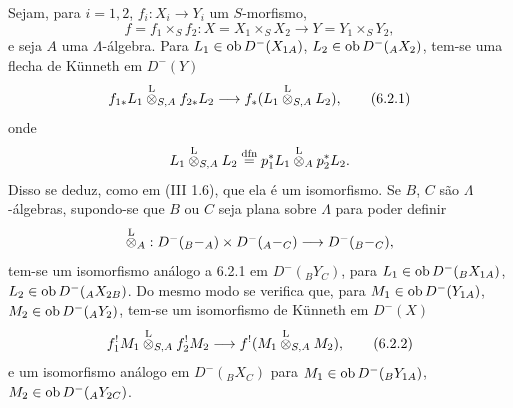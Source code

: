 Sejam, para $i=1,2$, $f_i:X_i\to Y_i$ um $S$-morfismo,
\[
f=f_1\times_S f_2:X=X_1\times_SX_2\longrightarrow Y=Y_1\times_SY_2,
\]
e seja $A$ uma $\Lambda$-álgebra. Para $L_1\in\operatorname{ob} D^-(X_{1A})$, $L_2\in\operatorname{ob} D^-({}_AX_2)$, tem-se uma flecha de Künneth em $D^-(Y)$
\begin{equation}
f_{1*}L_1\overset{\mathrm L}{\otimes}_{S,A}f_{2*}L_2
\longrightarrow
f_*(L_1\overset{\mathrm L}{\otimes}_{S,A}L_2),
\tag{6.2.1}
\end{equation}
onde
\[
L_1\overset{\mathrm L}{\otimes}_{S,A}L_2
\stackrel{\mathrm{dfn}}{=}p_1^*L_1\overset{\mathrm L}{\otimes}_Ap_2^*L_2.
\]
Disso se deduz, como em (III 1.6), que ela é um isomorfismo. Se $B$, $C$ são $\Lambda$-álgebras, supondo-se que $B$ ou $C$ seja plana sobre $\Lambda$ para poder definir
\[
\overset{\mathrm L}{\otimes}_A:D^-({}_B{-}_A)\times D^-({}_A{-}_C)\longrightarrow D^-({}_B{-}_C),
\]
tem-se um isomorfismo análogo a 6.2.1 em $D^-({}_BY_C)$, para $L_1\in\operatorname{ob} D^-({}_BX_{1A})$, $L_2\in\operatorname{ob} D^-({}_AX_{2B})$. Do mesmo modo se verifica que, para $M_1\in\operatorname{ob} D^-(Y_{1A})$, $M_2\in\operatorname{ob} D^-({}_AY_2)$, tem-se um isomorfismo de Künneth em $D^-(X)$
\begin{equation}
f_1^!M_1\overset{\mathrm L}{\otimes}_{S,A}f_2^!M_2
\longrightarrow
f^!(M_1\overset{\mathrm L}{\otimes}_{S,A}M_2),
\tag{6.2.2}
\end{equation}
e um isomorfismo análogo em $D^-({}_B X_C)$ para $M_1\in\operatorname{ob} D^-({}_BY_{1A})$, $M_2\in\operatorname{ob} D^-({}_AY_{2C})$.
